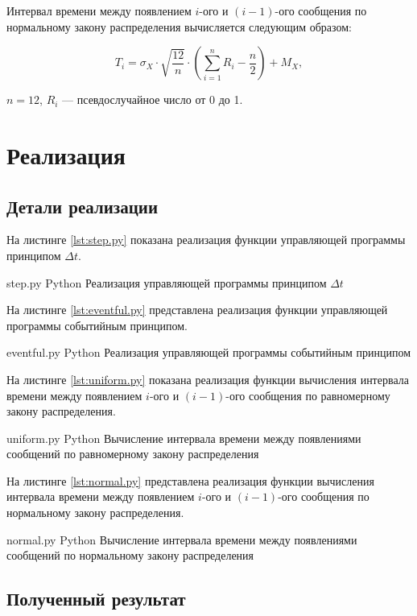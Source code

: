 Интервал времени между появлением $i$-ого и $(i - 1)$-ого сообщения по нормальному закону распределения вычисляется следующим образом:

\begin{equation}
	T_{i} = \sigma_{X} \cdot \sqrt{\frac{12}{n}} \cdot (\sum_{i = 1}^n R_{i} - \frac{n}{2}) + M_{X}, 
\end{equation}

 $n = 12$, $R_{i}$ --- псевдослучайное число от 0 до 1.

\chapter{Реализация}

\section{Детали реализации}

На листинге \ref{lst:step.py} показана реализация функции управляющей программы принципом $\Delta t$.

    {step.py}
    {Python}
    {Реализация управляющей программы принципом $\Delta t$}
\newpage

На листинге \ref{lst:eventful.py} представлена реализация функции управляющей программы событийным принципом.

    {eventful.py}
    {Python}
    {Реализация управляющей программы событийным принципом}
    
На листинге \ref{lst:uniform.py} показана реализация функции вычисления интервала времени между появлением $i$-ого и $(i - 1)$-ого сообщения по равномерному закону распределения.

    {uniform.py}
    {Python}
    {Вычисление интервала времени между появлениями сообщений по равномерному закону распределения}

На листинге \ref{lst:normal.py} представлена реализация функции вычисления интервала времени между появлением $i$-ого и $(i - 1)$-ого сообщения по нормальному закону распределения.

    {normal.py}
    {Python}
    {Вычисление интервала времени между появлениями сообщений по нормальному закону распределения}

\section{Полученный результат}

